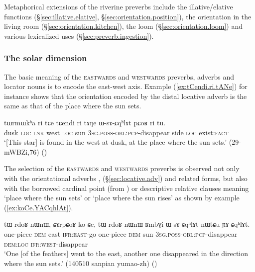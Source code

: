 Metaphorical extensions of the riverine preverbs include the illative/elative functions (§\ref{sec:illative.elative}, §\ref{sec:orientation.position}), the orientation in the living room (§\ref{sec:orientation.kitchen}), the loom (§\ref{sec:orientation.loom}) and various lexicalized uses (§\ref{sec:preverb.ingestion}).

\subsubsection{The solar dimension} \label{sec:solar.dimension} 
The basic meaning of the \textsc{eastwards} and \textsc{westwards} preverbs, adverbs and locator nouns is to encode the east-west axis. Example (\ref{ex:tCendi.ri.tANe}) for instance shows that the orientation encoded by the distal locative adverb  is the same as that of the place where the sun sets.

\begin{exe}
\ex \label{ex:tCendi.ri.tANe}
\gll  tɯrmɯkʰa ri tɕe tɕendi ri tɤŋe ɯ-sɤ-ɕqʰlɤt pɕoʁ ri tu. \\
dusk \textsc{loc} \textsc{lnk} west \textsc{loc} sun \textsc{3sg}.\textsc{poss}-\textsc{obl}:\textsc{pcp}-disappear side \textsc{loc} exist:\textsc{fact} \\
\glt `[This star] is found in the west at dusk, at the place where the sun sets.' (29-mWBZi,76)
()
\end{exe}

 The selection of the \textsc{eastwards} and \textsc{westwards} preverbs is observed not only with the orientational adverbs ,  (§\ref{sec:locative.adv}) and related forms, but also with the borrowed cardinal point  (from ) or  descriptive relative clauses meaning `place where the sun sets' or `place where the sun rises' as shown by example (\ref{ex:koCe.YACqhlAt}). 

\begin{exe}
\ex \label{ex:koCe.YACqhlAt}
\gll tɯ-rdoʁ nɯnɯ, ɕɤrpɕoʁ ko-ɕe, tɯ-rdoʁ nɯnɯ ʁmbɣi ɯ-sɤ-ɕqʰlɤt nɯtɕu ɲɤ-ɕqʰlɤt. \\
one-piece \textsc{dem} east \textsc{ifr}:\textsc{east}-go one-piece \textsc{dem} sun \textsc{3sg}.\textsc{poss}-\textsc{obl}:\textsc{pcp}-disappear \textsc{dem}:\textsc{loc} \textsc{ifr}:\textsc{west}-disappear \\
\glt `One [of the feathers] went to the east, another one disappeared in the direction where the sun sets.' (140510 sanpian yumao-zh) 	()
\end{exe}


